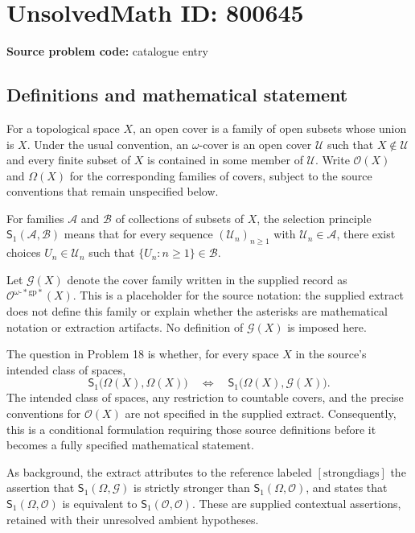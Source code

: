 \documentclass[11pt]{article}
\begin{document}
\section*{UnsolvedMath ID: 800645}
\textbf{Source problem code:} catalogue entry
\subsection{Definitions and mathematical statement}
For a topological space \(X\), an open cover is a family of open subsets whose union is \(X\). Under the usual convention, an \(\omega\)-cover is an open cover \(\mathcal U\) such that \(X\notin\mathcal U\) and every finite subset of \(X\) is contained in some member of \(\mathcal U\). Write \(\mathcal O(X)\) and \(\Omega(X)\) for the corresponding families of covers, subject to the source conventions that remain unspecified below.

For families \(\mathcal A\) and \(\mathcal B\) of collections of subsets of \(X\), the selection principle \(\mathsf S_1(\mathcal A,\mathcal B)\) means that for every sequence \((\mathcal U_n)_{n\geq 1}\) with \(\mathcal U_n\in\mathcal A\), there exist choices \(U_n\in\mathcal U_n\) such that \(\{U_n:n\geq 1\}\in\mathcal B\).

Let \(\mathcal G(X)\) denote the cover family written in the supplied record as \(\mathcal O^{\omega\text{-}*\mathrm{gp}*}(X)\). This is a placeholder for the source notation: the supplied extract does not define this family or explain whether the asterisks are mathematical notation or extraction artifacts. No definition of \(\mathcal G(X)\) is imposed here.

The question in Problem 18 is whether, for every space \(X\) in the source's intended class of spaces,
\[
\mathsf S_1\bigl(\Omega(X),\Omega(X)\bigr)
\quad\Longleftrightarrow\quad
\mathsf S_1\bigl(\Omega(X),\mathcal G(X)\bigr).
\]
The intended class of spaces, any restriction to countable covers, and the precise conventions for \(\mathcal O(X)\) are not specified in the supplied extract. Consequently, this is a conditional formulation requiring those source definitions before it becomes a fully specified mathematical statement.

As background, the extract attributes to the reference labeled \([\mathrm{strongdiags}]\) the assertion that \(\mathsf S_1(\Omega,\mathcal G)\) is strictly stronger than \(\mathsf S_1(\Omega,\mathcal O)\), and states that \(\mathsf S_1(\Omega,\mathcal O)\) is equivalent to \(\mathsf S_1(\mathcal O,\mathcal O)\). These are supplied contextual assertions, retained with their unresolved ambient hypotheses.
\end{document}
